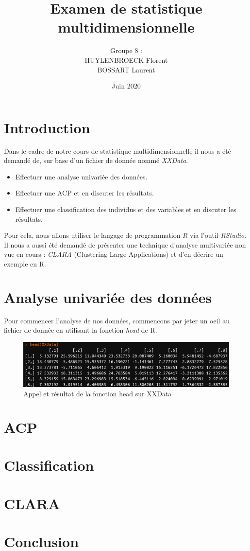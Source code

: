 \documentclass[11pt]{article}
\title{\huge Examen de statistique multidimensionnelle}
\author{Groupe 8 :\\
HUYLENBROECK Florent\\
BOSSART Laurent}
\date{Juin 2020}
\begin{document}
\maketitle
\newpage
\tableofcontents
\newpage
\section{Introduction}
Dans le cadre de notre cours de statistique multidimensionnelle il nous a été demandé de, sur base d'un fichier de donnée nommé \emph{XXData}.
\begin{itemize}
\item Effectuer une analyse univariée des données.
\item Effectuer une ACP et en discuter les résultats.
\item Effectuer une classification des individus et des variables et en discuter les résultats.
\end{itemize}
Pour cela, nous allons utiliser le langage de programmation \emph{R} via l'outil \emph{RStudio}.\\
Il nous a aussi été demandé de présenter une technique d'analyse multivariée non vue en cours : \emph{CLARA} (Clustering Large Applications) et d'en décrire un exemple en R.
\section{Analyse univariée des données}
Pour commencer l'analyse de nos données, commencons par jeter un oeil au fichier de donnée en utilisant la fonction \emph{head} de R.
\begin{figure}[h]
\centering
\includegraphics[scale=.75]{head.png}
\caption{Appel et résultat de la fonction head sur XXData}
\end{figure}
\section{ACP}
\section{Classification}
\section{CLARA}
\section{Conclusion}
\end{document}
